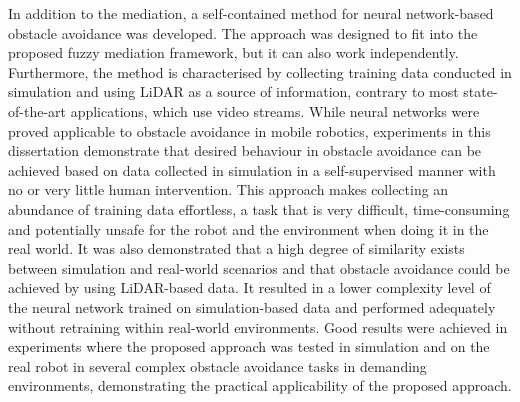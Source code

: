 In addition to the mediation, a self-contained method for neural network-based obstacle avoidance was developed. The approach was designed to fit into the proposed fuzzy mediation framework, but it can also work independently. Furthermore, the method is characterised by collecting training data conducted in simulation and using LiDAR as a source of information, contrary to most state-of-the-art applications, which use video streams. While neural networks were proved applicable to obstacle avoidance in mobile robotics, experiments in this dissertation demonstrate that desired behaviour in obstacle avoidance can be achieved based on data collected in simulation in a self-supervised manner with no or very little human intervention. This approach makes collecting an abundance of training data effortless, a task that is very difficult, time-consuming and potentially unsafe for the robot and the environment when doing it in the real world. It was also demonstrated that a high degree of similarity exists between simulation and real-world scenarios and that obstacle avoidance could be achieved by using LiDAR-based data. It resulted in a lower complexity level of the neural network trained on simulation-based data and performed adequately without retraining within real-world environments. Good results were achieved in experiments where the proposed approach was tested in simulation and on the real robot in several complex obstacle avoidance tasks in demanding environments, demonstrating the practical applicability of the proposed approach.

